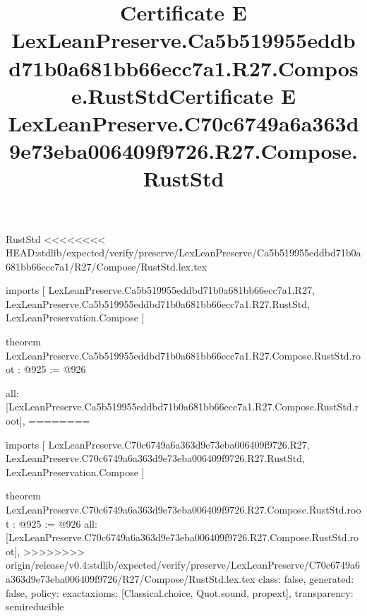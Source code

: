 \begin{lexlean}{RustStd}
<<<<<<<< HEAD:stdlib/expected/verify/preserve/LexLeanPreserve/Ca5b519955eddbd71b0a681bb66ecc7a1/R27/Compose/RustStd.lex.tex
\title{Certificate E LexLeanPreserve.Ca5b519955eddbd71b0a681bb66ecc7a1.R27.Compose.RustStd}
\begin{coremodule}
imports [
  LexLeanPreserve.Ca5b519955eddbd71b0a681bb66ecc7a1.R27,
  LexLeanPreserve.Ca5b519955eddbd71b0a681bb66ecc7a1.R27.RustStd,
  LexLeanPreservation.Compose
]

theorem LexLeanPreserve.Ca5b519955eddbd71b0a681bb66ecc7a1.R27.Compose.RustStd.root : @925 := @926 {
  all: [LexLeanPreserve.Ca5b519955eddbd71b0a681bb66ecc7a1.R27.Compose.RustStd.root],
========
\title{Certificate E LexLeanPreserve.C70c6749a6a363d9e73eba006409f9726.R27.Compose.RustStd}
\begin{coremodule}
imports [
  LexLeanPreserve.C70c6749a6a363d9e73eba006409f9726.R27,
  LexLeanPreserve.C70c6749a6a363d9e73eba006409f9726.R27.RustStd,
  LexLeanPreservation.Compose
]

theorem LexLeanPreserve.C70c6749a6a363d9e73eba006409f9726.R27.Compose.RustStd.root : @925 := @926 {
  all: [LexLeanPreserve.C70c6749a6a363d9e73eba006409f9726.R27.Compose.RustStd.root],
>>>>>>>> origin/release/v0.4:stdlib/expected/verify/preserve/LexLeanPreserve/C70c6749a6a363d9e73eba006409f9726/R27/Compose/RustStd.lex.tex
  class: false,
  generated: false,
  policy: exact{axioms: [Classical.choice, Quot.sound, propext]},
  transparency: semireducible
}


\end{coremodule}}
\end{coremodule}
\end{lexlean}
